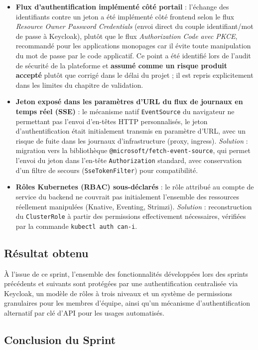 \begin{itemize}
    \item \textbf{Flux d'authentification implémenté côté portail} : l'échange des identifiants contre un jeton a été implémenté côté frontend selon le flux \textit{Resource Owner Password Credentials} (envoi direct du couple identifiant/mot de passe à Keycloak), plutôt que le flux \textit{Authorization Code avec PKCE}, recommandé pour les applications monopages car il évite toute manipulation du mot de passe par le code applicatif. Ce point a été identifié lors de l'audit de sécurité de la plateforme et \textbf{assumé comme un risque produit accepté} plutôt que corrigé dans le délai du projet ; il est repris explicitement dans les limites du chapitre de validation.
    \item \textbf{Jeton exposé dans les paramètres d'URL du flux de journaux en temps réel (SSE)} : le mécanisme natif \texttt{EventSource} du navigateur ne permettant pas l'envoi d'en-têtes HTTP personnalisés, le jeton d'authentification était initialement transmis en paramètre d'URL, avec un risque de fuite dans les journaux d'infrastructure (proxy, ingress). \textit{Solution} : migration vers la bibliothèque \texttt{@microsoft/fetch-event-source}, qui permet l'envoi du jeton dans l'en-tête \texttt{Authorization} standard, avec conservation d'un filtre de secours (\texttt{SseTokenFilter}) pour compatibilité.
    \item \textbf{Rôles Kubernetes (RBAC) sous-déclarés} : le rôle attribué au compte de service du backend ne couvrait pas initialement l'ensemble des ressources réellement manipulées (Knative, Eventing, Strimzi). \textit{Solution} : reconstruction du \texttt{ClusterRole} à partir des permissions effectivement nécessaires, vérifiées par la commande \texttt{kubectl auth can-i}.
\end{itemize}

\subsection{Résultat obtenu}

À l'issue de ce sprint, l'ensemble des fonctionnalités développées lors des sprints précédents et suivants sont protégées par une authentification centralisée via Keycloak, un modèle de rôles à trois niveaux et un système de permissions granulaires pour les membres d'équipe, ainsi qu'un mécanisme d'authentification alternatif par clé d'API pour les usages automatisés.

\subsection{Conclusion du Sprint}

